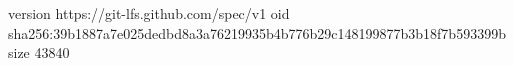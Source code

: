 version https://git-lfs.github.com/spec/v1
oid sha256:39b1887a7e025dedbd8a3a76219935b4b776b29c148199877b3b18f7b593399b
size 43840
